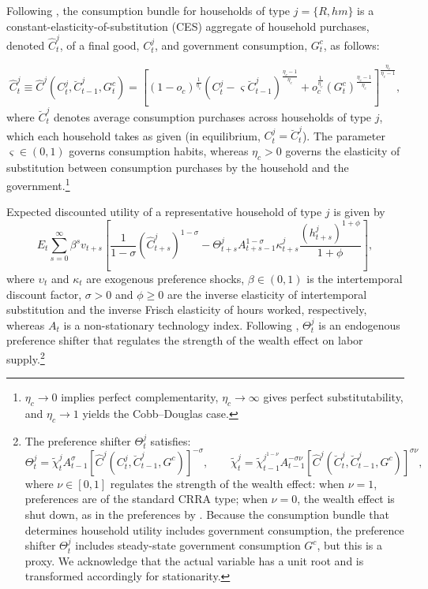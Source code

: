 \documentclass[12pt]{article}
\begin{document}
Following \citet{coenen2013gauging}, the consumption bundle for households of type $j=\{R,hm\}$ is a constant-elasticity-of-substitution (CES) aggregate of household purchases, denoted $\hat{C}_t^j$, of a final good, $C_t^j$, and government consumption, $G_t^c$, as follows:

\begin{equation*}
\hat{C}_t^j \equiv \hat{C}^j(C_t^j,\breve{C}_{t-1}^j,G_t^c)= \left[(1-o_c)^{\frac{1}{\eta_c}}\left(C_t^j-\varsigma \breve{C}_{t-1}^j\right)^{\frac{\eta_c-1}{\eta_c}}+o_c^{\frac{1}{\eta_c}}\left(G_t^c\right)^{\frac{\eta_c-1}{\eta_c}}\right]^{\frac{\eta_c}{\eta_c-1}},
\end{equation*}
where $\breve{C}_t^j$ denotes average consumption purchases across households of type $j$, which each household takes as given (in equilibrium, $ C_t^j=\breve{C}_t^j$). The parameter $\varsigma\in (0,1)$ governs consumption habits, whereas $\eta_c>0$ governs the elasticity of substitution between consumption purchases by the household and the government.\footnote{$\eta_c \to 0$ implies perfect complementarity, $\eta_c \to \infty$ gives perfect substitutability, and $\eta_c \to 1$ yields the Cobb–Douglas case.}

Expected discounted utility of a representative household of type $j$ is given by
\begin{equation}
E_{t}\sum_{s=0}^{\infty }\beta ^{s}v_{t+s}\left[ \frac{1}{1-\sigma }\left(\hat{C}^j_{t+s}\right) ^{1-\sigma }-\Theta^j_{t+s}A_{t+s-1}^{1-\sigma }\kappa _{t+s}^j\frac{\left(h^j_{t+s}\right)^{1+\phi }}{1+\phi }\right], 
\label{eq:Households_1}
\end{equation}%
where $\upsilon_t$ and $\kappa _{t}$ are exogenous preference shocks, $\beta \in (0,1)$ is the intertemporal discount factor, $\sigma >0$ and $\phi \geq 0$ are the inverse elasticity of intertemporal substitution and the inverse Frisch elasticity of hours worked, respectively, whereas $A_{t}$ is a non-stationary technology index. Following \citet{gali2012unemployment}, $\Theta^j_{t}$ is an endogenous preference shifter that regulates the strength of the wealth effect on labor supply.\footnote{The preference shifter $\Theta^j_{t}$ satisfies:
\begin{equation*}
\Theta^j_{t}= \widetilde{\chi }_{t}^j A_{t-1}^{\sigma }\left[\hat{C}^j(C_t^j,\breve{C}_{t-1}^j,G^c)\right]^{-\sigma },\qquad \widetilde{\chi }_{t}^j=\widetilde{\chi }%
_{t-1}^{j^{1-\nu }}A_{t-1}^{-\sigma \nu }\left[\hat{C}^j(\breve{C}_t^j,\breve{C}_{t-1}^j,G^c)\right] ^{\sigma \nu },
\end{equation*}
where $\nu \in \left[ 0,1 \right]$ regulates the strength of the wealth effect: when $\nu=1$, preferences are of the standard CRRA type; when $\nu=0$, the wealth effect is shut down, as in the preferences by \citet{greenwood1988investment}. Because the consumption bundle that determines household utility includes government consumption, the preference shifter $\Theta^j_t$ includes steady-state government consumption $G^c$, but this is a proxy. We acknowledge that the actual variable has a unit root and is transformed accordingly for stationarity.}
\end{document}

